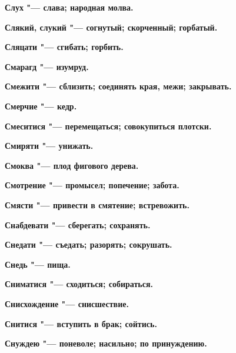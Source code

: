 \begin{mymulticols}{2}
\bfseries Слух\normalfont{} "--- слава; народная молва. 




\bfseries Слякий, слукий\normalfont{} "--- согнутый; скорченный; горбатый. 




\bfseries Сляцати\normalfont{} "--- сгибать; горбить. 




\bfseries Смарагд\normalfont{} "--- изумруд. 




\bfseries Смежити\normalfont{} "--- сблизить; соединять края, межи; закрывать. 




\bfseries Смерчие\normalfont{} "--- кедр. 




\bfseries Смеситися\normalfont{} "--- перемещаться; совокупиться плотски. 




\bfseries Смиряти\normalfont{} "--- унижать. 




\bfseries Смоква\normalfont{} "--- плод фигового дерева. 




\bfseries Смотрение\normalfont{} "--- промысел; попечение; забота. 




\bfseries Смясти\normalfont{} "--- привести в смятение; встревожить. 




\bfseries Снабдевати\normalfont{} "--- сберегать; сохранять. 




\bfseries Снедати\normalfont{} "--- съедать; разорять; сокрушать. 




\bfseries Снедь\normalfont{} "--- пища. 




\bfseries Сниматися\normalfont{} "--- сходиться; собираться. 




\bfseries Снисхождение\normalfont{} "--- снисшествие. 




\bfseries Снитися\normalfont{} "--- вступить в брак; сойтись. 




\bfseries Снуждею\normalfont{} "--- поневоле; насильно; по принуждению. 





\end{mymulticols}
